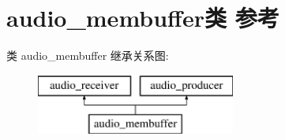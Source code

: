\hypertarget{classaudio__membuffer}{}\section{audio\+\_\+membuffer类 参考}
\label{classaudio__membuffer}
类 audio\+\_\+membuffer 继承关系图\+:\begin{figure}[H]
\begin{center}
\leavevmode
\includegraphics[height=2.000000cm]{classaudio__membuffer}
\end{center}
\end{figure}
